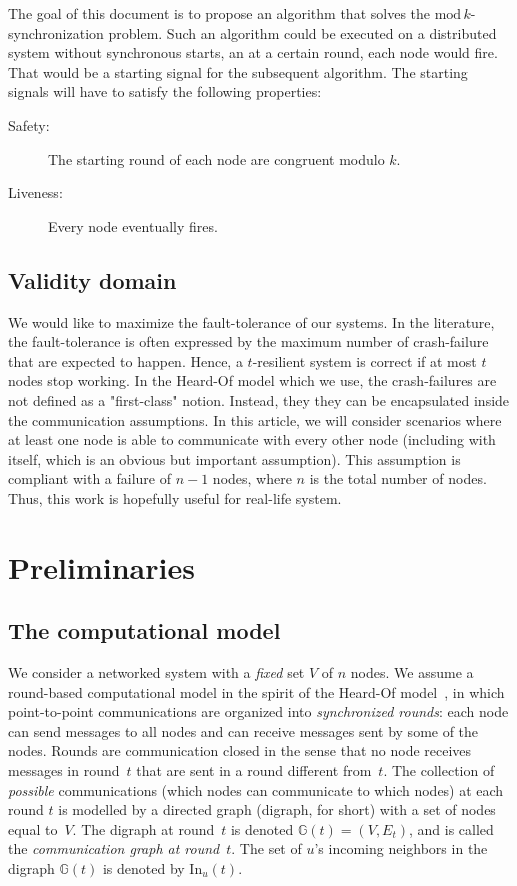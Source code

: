 \documentclass{article}
\newcommand{\dG}{\mathds{G}}
\newcommand{\In}{\mathrm{In}}
\begin{document}
The goal of this document is to propose an algorithm that solves the $\mathrm{mod}\,k$-synchronization problem.
Such an algorithm could be executed on a distributed system without synchronous starts,
an at a certain round, each node would fire.
That would be a starting signal for the subsequent algorithm.
The starting signals will have to satisfy the following properties:
\begin{description}
	\item[Safety:] The starting round of each node are congruent modulo $k$.
	\item[Liveness:] Every node eventually fires.
\end{description}

\subsection{Validity domain}

We would like to maximize the fault-tolerance of our systems.
In the literature, the fault-tolerance is often expressed by the maximum number of crash-failure that are expected to happen.
Hence, a $t$-resilient system is correct if at most $t$ nodes stop working.
In the Heard-Of model \cite{CBS09} which we use, the crash-failures are not defined as a "first-class" notion.
Instead, they they can be encapsulated inside the communication assumptions.
In this article, we will consider scenarios where at least one node is able to communicate with every other node (including with itself, which is an obvious but important assumption).
This assumption is compliant with a failure of $n-1$ nodes, where $n$ is the total number of nodes.
Thus, this work is hopefully useful for real-life system.

\section{ Preliminaries}\label{sec:model}
 
\subsection{The computational model}
	
We consider a networked system with a {\em fixed} set $V$ of $n$ nodes.
We assume a round-based computational model  in the spirit of the Heard-Of model~\cite{CBS09}, 
	in which point-to-point communications are organized into \emph{synchronized rounds}: 
	each node can send messages  to all nodes and can receive messages sent  by some of the nodes.
Rounds are communication closed in the sense that no node receives messages in round~$t$ that are sent 
	in a round different from~$t$. 
The collection of \emph{possible} communications (which nodes can communicate to which nodes) at each round $t$
	is modelled by a directed graph (digraph, for short) with a set of nodes equal to~$V$.
The digraph at round~$t$ is  denoted $\dG(t)=(V,E_t)$, and is called the \emph{communication graph at round}~$t$. 
The set of $u$'s incoming neighbors in the digraph $\dG(t)$ is denoted by $\In_u(t)$.
\end{document}
